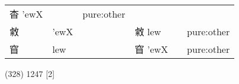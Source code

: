 \documentclass[14pt,a4paper]{scrartcl}
\begin{document}
\begin{longtable}[c]{@{}llllll@{}}
\begin{minipage}[t]{0.14\columnwidth}
杳 'ewX
\strut\end{minipage} &
\begin{minipage}[t]{0.14\columnwidth}\raggedright\strut
\strut\end{minipage} &
\begin{minipage}[t]{0.14\columnwidth}\raggedright\strut
pure:other
\strut\end{minipage}\tabularnewline
\begin{minipage}[t]{0.14\columnwidth}\raggedright\strut
敹
\strut\end{minipage} &
\begin{minipage}[t]{0.14\columnwidth}\raggedright\strut
'ewX
\strut\end{minipage} &
\begin{minipage}[t]{0.14\columnwidth}\raggedright\strut
\strut\end{minipage} &
\begin{minipage}[t]{0.14\columnwidth}\raggedright\strut
敹 lew
\strut\end{minipage} &
\begin{minipage}[t]{0.14\columnwidth}\raggedright\strut
\strut\end{minipage} &
\begin{minipage}[t]{0.14\columnwidth}\raggedright\strut
pure:other
\strut\end{minipage}\tabularnewline
\begin{minipage}[t]{0.14\columnwidth}\raggedright\strut
窅
\strut\end{minipage} &
\begin{minipage}[t]{0.14\columnwidth}\raggedright\strut
lew
\strut\end{minipage} &
\begin{minipage}[t]{0.14\columnwidth}\raggedright\strut
\strut\end{minipage} &
\begin{minipage}[t]{0.14\columnwidth}\raggedright\strut
窅 'ewX
\strut\end{minipage} &
\begin{minipage}[t]{0.14\columnwidth}\raggedright\strut
\strut\end{minipage} &
\begin{minipage}[t]{0.14\columnwidth}\raggedright\strut
pure:other
\strut\end{minipage}\tabularnewline
\bottomrule
\end{longtable}

(328) 1247 {[}2{]}
\end{document}
